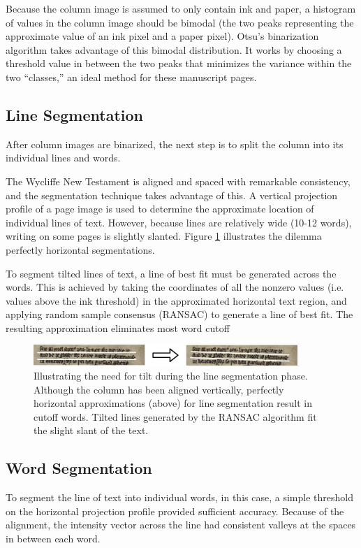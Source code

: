 \documentclass[final]{ukthesis}
\begin{document}
Because the column image is assumed to only contain ink and paper, a histogram of values in the column image should be bimodal (the two peaks representing the approximate value of an ink pixel and a paper pixel). Otsu's binarization algorithm \cite{otsu1979threshold} takes advantage of this bimodal distribution. It works by choosing a threshold value in between the two peaks that minimizes the variance within the two ``classes,'' an ideal method for these manuscript pages.


\subsection{Line Segmentation}
After column images are binarized, the next step is to split the column into its individual lines and words.

The Wycliffe New Testament is aligned and spaced with remarkable consistency, and the segmentation technique takes advantage of this. A vertical projection profile of a page image is used to determine the approximate location of individual lines of text. However, because lines are relatively wide (10-12 words), writing on some pages is slightly slanted. Figure \ref{fig:flat-vs-tilted} illustrates the dilemma perfectly horizontal segmentations.

To segment tilted lines of text, a line of best fit must be generated across the words. This is achieved by taking the coordinates of all the nonzero values (i.e. values above the ink threshold) in the approximated horizontal text region, and applying random sample consensus (RANSAC) \cite{fischler1987random} to generate a line of best fit. The resulting approximation eliminates most word cutoff

\begin{figure}[t]
\begin{center}
\includegraphics[width=10cm]{flat-vs-tilted}
\end{center}
\caption{Illustrating the need for tilt during the line segmentation phase. Although the column has been aligned vertically, perfectly horizontal approximations (above) for line segmentation result in cutoff words. Tilted lines generated by the RANSAC algorithm fit the slight slant of the text.}
\label{fig:flat-vs-tilted}
\end{figure}


\subsection{Word Segmentation}
To segment the line of text into individual words, in this case, a simple threshold on the horizontal projection profile provided sufficient accuracy. Because of the alignment, the intensity vector across the line had consistent valleys at the spaces in between each word.
\end{document}
